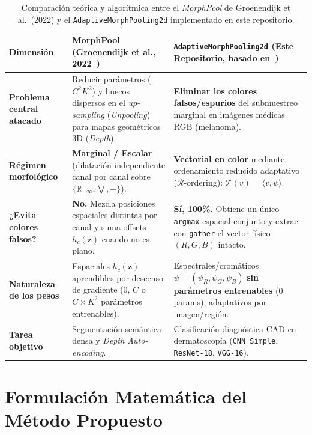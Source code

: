 \documentclass[10pt,a4paper,twocolumn]{article}
\begin{document}
\begin{table}[t]
\centering
\caption{Comparación teórica y algorítmica entre el \emph{MorphPool} de Groenendijk et al.\ (2022) y el \texttt{AdaptiveMorphPooling2d} implementado en este repositorio.}
\label{tab:groenendijk_vs_tesis}
\footnotesize
\begin{tabularx}{\textwidth}{>{\bfseries}p{3.3cm} X X}
\toprule
Dimensión & \textbf{MorphPool (Groenendijk et al., 2022~\cite{groenendijk2022morphpool})} & \textbf{\texttt{AdaptiveMorphPooling2d} (Este Repositorio, basado en~\cite{vazquez2019adaptive})} \\
\midrule
Problema central atacado & Reducir parámetros ($C^2 K^2$) y huecos dispersos en el \emph{up-sampling} (\emph{Unpooling}) para mapas geométricos 3D (\emph{Depth}). & \textbf{Eliminar los colores falsos/espurios} del submuestreo marginal en imágenes médicas RGB (melanoma). \\
Régimen morfológico & \textbf{Marginal / Escalar} (dilatación independiente canal por canal sobre $\{\mathbb{R}_{-\infty}, \bigvee, +\}$). & \textbf{Vectorial en color} mediante ordenamiento reducido adaptativo ($\mathcal{R}$-ordering): $\mathcal{T}(v) = \langle v, \psi \rangle$. \\
¿Evita colores falsos? & \textbf{No.} Mezcla posiciones espaciales distintas por canal y suma offsets $h_c(\mathbf{z})$ cuando no es plano. & \textbf{Sí, 100\%.} Obtiene un único \texttt{argmax} espacial conjunto y extrae con \texttt{gather} el vector físico $(R,G,B)$ intacto. \\
Naturaleza de los pesos & Espaciales $h_c(\mathbf{z})$ aprendibles por descenso de gradiente ($0$, $C$ o $C\times K^2$ parámetros entrenables). & Espectrales/cromáticos $\psi = (\psi_R,\psi_G,\psi_B)$ \textbf{sin parámetros entrenables} ($0$ params), adaptativos por imagen/región. \\
Tarea objetivo & Segmentación semántica densa y \emph{Depth Auto-encoding}. & Clasificación diagnóstica CAD en dermatoscopía (\texttt{CNN Simple}, \texttt{ResNet-18}, \texttt{VGG-16}). \\
\bottomrule
\end{tabularx}
\end{table}

\section{Formulación Matemática del Método Propuesto}
\end{document}

